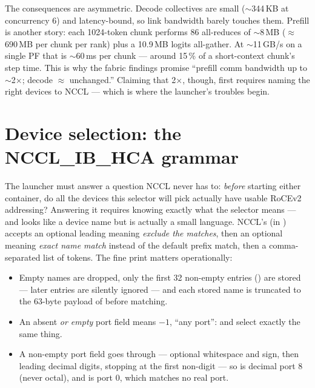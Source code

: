 The consequences are asymmetric. Decode collectives are small
($\sim$344\,KB at concurrency 6) and latency-bound, so link bandwidth barely
touches them. Prefill is another story: each 1024-token chunk performs 86
all-reduces of $\sim$8\,MB ($\approx$690\,MB per chunk per rank) plus a
10.9\,MB logits all-gather. At $\sim$11\,GB/s on a single PF that is
$\sim$60\,ms per chunk --- around 15\,\% of a short-context chunk's step time.
This is why the fabric findings promise ``prefill comm bandwidth up to
$\sim$2$\times$; decode $\approx$ unchanged.'' Claiming that 2$\times$,
though, first requires naming the right devices to NCCL --- which is where
the launcher's troubles begin.

\section{Device selection: the NCCL\_IB\_HCA grammar}
\label{sec:fabric-selector}

The launcher must answer a question NCCL never has to: \emph{before}
starting either container, do all the devices this selector will pick
actually have usable RoCEv2 addressing? Answering it requires knowing
exactly what the selector means --- and  looks like a
device name but is actually a small language. NCCL's 
(in ) accepts an optional leading \code{^} meaning
\emph{exclude the matches}, then an optional \code{=} meaning \emph{exact
name match} instead of the default prefix match, then a comma-separated list
of  tokens. The fine print matters
operationally:

\begin{itemize}
  \item Empty names are dropped, only the first 32 non-empty entries
        () are stored --- later entries are silently
        ignored --- and each stored name is truncated to the 63-byte payload
        of  before matching.
  \item An absent \emph{or empty} port field means $-1$, ``any port'':
         and  select exactly the same thing.
  \item A non-empty port field goes through  --- optional
        whitespace and sign, then leading decimal digits, stopping at the
        first non-digit --- so  is decimal port 8 (never octal),
        and  is port 0, which matches no real port.
\end{itemize}

